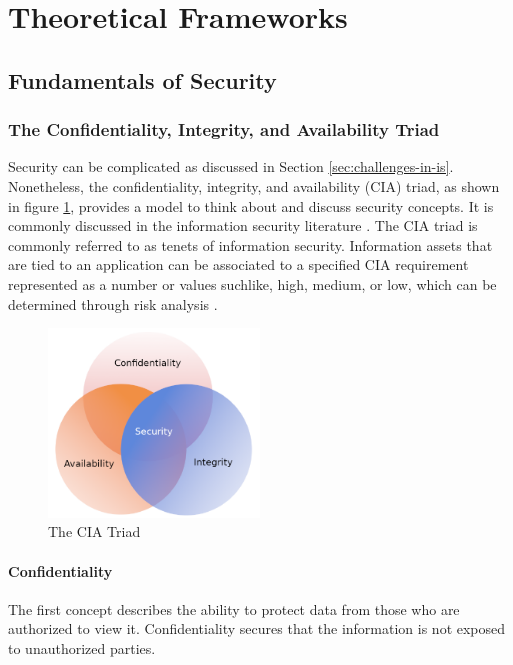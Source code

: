 \section{Theoretical Frameworks}

\subsection{Fundamentals of Security}

\subsubsection{The Confidentiality, Integrity, and Availability Triad}
Security can be complicated as discussed in Section \ref{sec:challenges-in-is}. Nonetheless, the confidentiality, integrity, and availability (CIA) triad, as shown in figure \ref{fig:cia}, provides a model to think about and discuss security concepts. It is commonly discussed in the information security literature \cite{andress2014the} \cite{srinivasan2016cissp} \cite{death2017information}. The CIA triad is commonly referred to as tenets of information security. Information assets that are tied to an application can be associated to a specified CIA requirement represented as a number or values suchlike, high, medium, or low, which can be determined through risk analysis \cite{srinivasan2016cissp}. 

\begin{figure}[!h]
    \centering
    \includegraphics[width=0.5\textwidth]{../../img/chapter_2/cia-triad.png}
    \caption{The CIA Triad}\label{fig:cia}
\end{figure}

\paragraph{Confidentiality}
The first concept describes the ability to protect data from those who are authorized to view it. Confidentiality secures that the information is not exposed to unauthorized parties.

